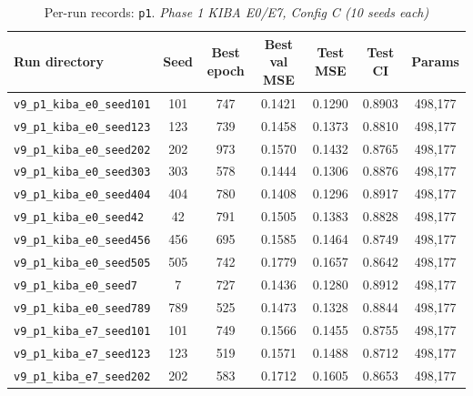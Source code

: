 \begin{table}[!h]
\centering\scriptsize
\caption{Per-run records: \texttt{p1}. \textit{Phase 1 KIBA E0/E7, Config C (10 seeds each)}}
\label{tab:v9_runs_p1}
\begin{tabular}{p{4.8cm}cccccc}
\toprule
Run directory & Seed & Best epoch & Best val MSE & Test MSE & Test CI & Params \\
\midrule
\texttt{v9\_\allowbreak{}p1\_\allowbreak{}kiba\_\allowbreak{}e0\_\allowbreak{}seed101} & 101 & 747 & 0.1421 & 0.1290 & 0.8903 & 498,177 \\
\texttt{v9\_\allowbreak{}p1\_\allowbreak{}kiba\_\allowbreak{}e0\_\allowbreak{}seed123} & 123 & 739 & 0.1458 & 0.1373 & 0.8810 & 498,177 \\
\texttt{v9\_\allowbreak{}p1\_\allowbreak{}kiba\_\allowbreak{}e0\_\allowbreak{}seed202} & 202 & 973 & 0.1570 & 0.1432 & 0.8765 & 498,177 \\
\texttt{v9\_\allowbreak{}p1\_\allowbreak{}kiba\_\allowbreak{}e0\_\allowbreak{}seed303} & 303 & 578 & 0.1444 & 0.1306 & 0.8876 & 498,177 \\
\texttt{v9\_\allowbreak{}p1\_\allowbreak{}kiba\_\allowbreak{}e0\_\allowbreak{}seed404} & 404 & 780 & 0.1408 & 0.1296 & 0.8917 & 498,177 \\
\texttt{v9\_\allowbreak{}p1\_\allowbreak{}kiba\_\allowbreak{}e0\_\allowbreak{}seed42} & 42 & 791 & 0.1505 & 0.1383 & 0.8828 & 498,177 \\
\texttt{v9\_\allowbreak{}p1\_\allowbreak{}kiba\_\allowbreak{}e0\_\allowbreak{}seed456} & 456 & 695 & 0.1585 & 0.1464 & 0.8749 & 498,177 \\
\texttt{v9\_\allowbreak{}p1\_\allowbreak{}kiba\_\allowbreak{}e0\_\allowbreak{}seed505} & 505 & 742 & 0.1779 & 0.1657 & 0.8642 & 498,177 \\
\texttt{v9\_\allowbreak{}p1\_\allowbreak{}kiba\_\allowbreak{}e0\_\allowbreak{}seed7} & 7 & 727 & 0.1436 & 0.1280 & 0.8912 & 498,177 \\
\texttt{v9\_\allowbreak{}p1\_\allowbreak{}kiba\_\allowbreak{}e0\_\allowbreak{}seed789} & 789 & 525 & 0.1473 & 0.1328 & 0.8844 & 498,177 \\
\texttt{v9\_\allowbreak{}p1\_\allowbreak{}kiba\_\allowbreak{}e7\_\allowbreak{}seed101} & 101 & 749 & 0.1566 & 0.1455 & 0.8755 & 498,177 \\
\texttt{v9\_\allowbreak{}p1\_\allowbreak{}kiba\_\allowbreak{}e7\_\allowbreak{}seed123} & 123 & 519 & 0.1571 & 0.1488 & 0.8712 & 498,177 \\
\texttt{v9\_\allowbreak{}p1\_\allowbreak{}kiba\_\allowbreak{}e7\_\allowbreak{}seed202} & 202 & 583 & 0.1712 & 0.1605 & 0.8653 & 498,177 \\

\end{tabular}
\end{table}
